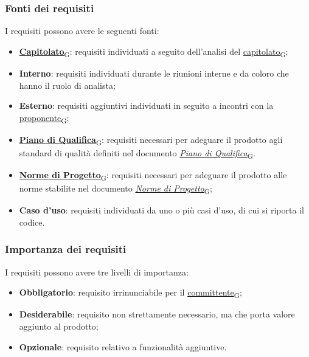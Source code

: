 \subsubsection{Fonti dei requisiti}
\label{sec:fonti_requisiti}
I requisiti possono avere le seguenti fonti:
\begin{itemize}
	\item \href{https://7last.github.io/docs/rtb/documentazione-interna/glossario\#capitolato}{\textbf{Capitolato}\textsubscript{G}}: requisiti individuati a seguito dell'analisi del \href{https://7last.github.io/docs/rtb/documentazione-interna/glossario\#capitolato}{capitolato\textsubscript{G}};
	\item \textbf{Interno}: requisiti individuati durante le riunioni interne e da coloro che hanno il ruolo di analista;
	\item \textbf{Esterno}: requisiti aggiuntivi individuati in seguito a incontri con la \href{https://7last.github.io/docs/rtb/documentazione-interna/glossario\#proponente}{proponente\textsubscript{G}};
	\item \href{https://7last.github.io/docs/rtb/documentazione-interna/glossario\#piano-di-qualifica}{\textbf{Piano di Qualifica}\textsubscript{G}}: requisiti necessari per adeguare il prodotto agli standard di qualità definiti nel documento \href{https://7last.github.io/docs/rtb/documentazione-interna/glossario\#piano-di-qualifica}{\textit{Piano di Qualifica}\textsubscript{G}}.
	\item \href{https://7last.github.io/docs/rtb/documentazione-interna/glossario\#norme-di-progetto}{\textbf{Norme di Progetto}\textsubscript{G}}: requisiti necessari per adeguare il prodotto alle norme stabilite nel documento \href{https://7last.github.io/docs/rtb/documentazione-interna/glossario\#norme-di-progetto}{\textit{Norme di Progetto}\textsubscript{G}};
	\item \textbf{Caso d'uso}: requisiti individuati da uno o più casi d'uso, di cui si riporta il codice.
\end{itemize}

\subsubsection{Importanza dei requisiti}
\label{sec:importanza_requisiti}
I requisiti possono avere tre livelli di importanza:
\begin{itemize}
	\item \textbf{Obbligatorio}: requisito irrinunciabile per il \href{https://7last.github.io/docs/rtb/documentazione-interna/glossario\#committente}{committente\textsubscript{G}};
	\item \textbf{Desiderabile}: requisito non strettamente necessario, ma che porta valore aggiunto al prodotto;
	\item \textbf{Opzionale}: requisito relativo a funzionalità aggiuntive.
\end{itemize}


